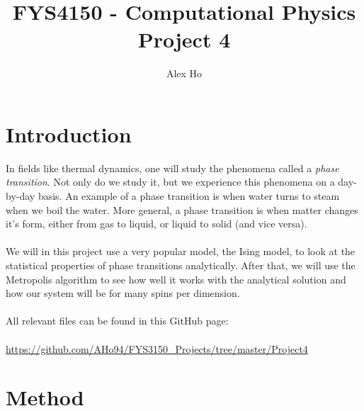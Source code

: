 \documentclass[12pt]{article}
\author{Alex Ho}
\title{FYS4150 - Computational Physics \\ Project 4}
\begin{document}
\maketitle
\begin{abstract}

\end{abstract}
\newpage
\tableofcontents
\newpage
\section{Introduction} \label{section:intro}
In fields like thermal dynamics, one will study the phenomena called a \emph{phase transition}. Not only do we study it, but we experience this phenomena on a day-by-day basis. An example of a phase transition is when water turns to steam when we boil the water. More general, a phase transition is when matter changes it's form, either from gas to liquid, or liquid to solid (and vice versa).\\\\
We will in this project use a very popular model, the Ising model, to look at the statistical properties of phase transitions analytically. After that, we will use the Metropolis algorithm to see how well it works with the analytical solution and how our system will be for many spins per dimension.\\\\
All relevant files can be found in this GitHub page:\\\\
\url{https://github.com/AHo94/FYS3150_Projects/tree/master/Project4}


\section{Method} \label{section:methods}
\end{document}
